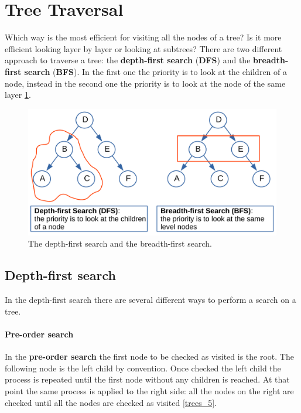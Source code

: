 \section{Tree Traversal}
Which way is the most efficient for visiting all the nodes of a tree? Is it more efficient looking layer by layer or looking at subtrees? There are two different approach to traverse a tree: the \textbf{depth-first search} (\textbf{DFS}) and the \textbf{breadth-first search} (\textbf{BFS}). In the first one the priority is to look at the children of a node, instead in the second one the priority is to look at the node of the same layer \ref{trees_4}.

\begin{figure}[H]
	\begin{center}
		\includegraphics[scale=.6]{chapters/trees/images/trees_4.pdf}
		\caption[The depth-first search and the breadth-first search.]{The depth-first search and the breadth-first search.}
		\label{trees_4}
	\end{center}
\end{figure}

\subsection{Depth-first search}
In the depth-first search there are several different ways to perform a search on a tree.
\paragraph{Pre-order search}
\label{preorder}
In the \textbf{pre-order search} the first node to be checked as visited is the root. The following node is the left child by convention. Once checked the left child the process is repeated until the first node without any children is reached. At that point the same process is applied to the right side: all the nodes on the right are checked until all the nodes are checked as visited \ref{trees_5}.


